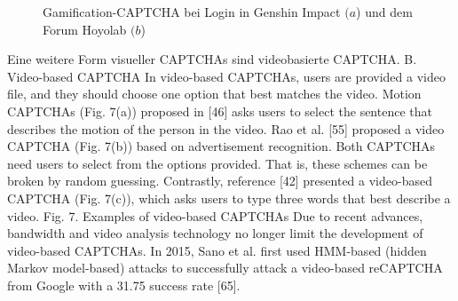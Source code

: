 \begin{figure}
    \centering
    \qquad
    \caption{Gamification-CAPTCHA bei Login in Genshin Impact $(a$) und dem Forum Hoyolab $(b$)}   
\end{figure}

Eine weitere Form visueller CAPTCHAs sind videobasierte CAPTCHA. 
B. Video-based CAPTCHA
In video-based CAPTCHAs, users are provided a video
file, and they should choose one option that best matches the
video. Motion CAPTCHAs (Fig. 7(a)) proposed in [46] asks
users to select the sentence that describes the motion of the
person in the video. Rao et al. [55] proposed a video
CAPTCHA (Fig. 7(b)) based on advertisement recognition.
Both CAPTCHAs need users to select from the options
provided. That is, these schemes can be broken by random
guessing. Contrastly, reference [42] presented a video-based
CAPTCHA (Fig. 7(c)), which asks users to type three words
that best describe a video.
Fig. 7. Examples of video-based CAPTCHAs
Due to recent advances, bandwidth and video analysis
technology no longer limit the development of video-based
CAPTCHAs. In 2015, Sano et al. first used HMM-based
(hidden Markov model-based) attacks to successfully attack a
video-based reCAPTCHA from Google with a 31.75%
success rate [65]. 



